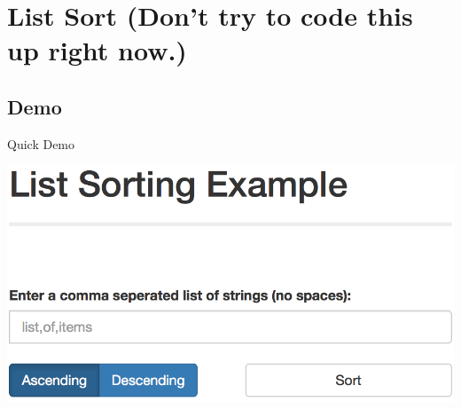 \documentclass{beamer}
\begin{document}
\section[List Sort]{List Sort \newline (Don't try to code this up right now.)}
\subsection{Demo}
	\begin{frame}[t]{Quick Demo}
		\vfill
		\begin{center}
			\href{http://127.0.0.1:5000}{\includegraphics[scale=0.4]{images/list-sort.png}}
		\end{center}
		\vfill
	\end{frame}
\end{document}
